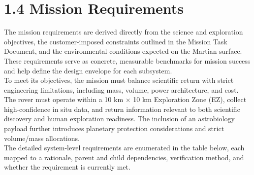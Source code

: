 \section*{1.4 Mission Requirements}

The mission requirements are derived directly from the science and exploration objectives, the customer-imposed constraints outlined in the Mission Task Document, and the environmental conditions expected on the Martian surface. These requirements serve as concrete, measurable benchmarks for mission success and help define the design envelope for each subsystem.
\\
To meet its objectives, the mission must balance scientific return with strict engineering limitations, including mass, volume, power architecture, and cost. The rover must operate within a 10 km $\times$ 10 km Exploration Zone (EZ), collect high-confidence in situ data, and return information relevant to both scientific discovery and human exploration readiness. The inclusion of an astrobiology payload further introduces planetary protection considerations and strict volume/mass allocations.\\

The detailed system-level requirements are enumerated in the table below, each mapped to a rationale, parent and child dependencies, verification method, and whether the requirement is currently met.

